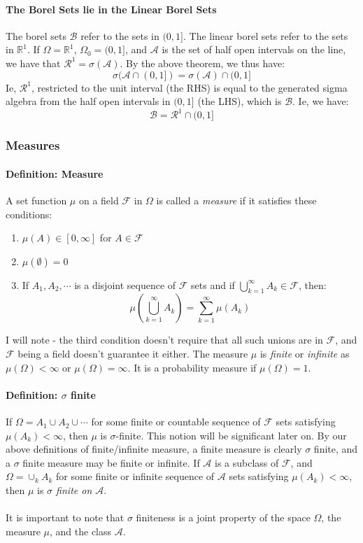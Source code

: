 \documentclass[12pt,a4paper]{article}
\newcommand{\1}[1]{\mathbbm{1}\left\{ #1 \right\}}
\newcommand{\R}{\mathbb{R}}
\newcommand{\acal}{\mathcal{A}}
\newcommand{\fcal}{\mathcal{F}}
\newcommand{\bcal}{\mathcal{B}}
\newcommand{\rcal}{\mathcal{R}}
\begin{document}
\paragraph{The Borel Sets lie in the Linear Borel Sets} The borel sets $\bcal$ refer to the sets in $(0,1]$. The linear borel sets refer to the sets in $\R^1$. If $\Omega = \R^1$, $\Omega_0 = (0,1]$, and $\acal$ is the set of half open intervals on the line, we have that $\rcal^1 = \sigma(\acal)$. By the above theorem, we thus have:
$$
	\sigma(\acal \cap (0,1]) = \sigma(\acal) \cap (0,1]
$$
Ie, $\rcal^1$, restricted to the unit interval (the RHS) is equal to the generated sigma algebra from the half open intervals in $(0,1]$ (the LHS), which is $\bcal$. Ie, we have:
$$
	\bcal = \rcal^1 \cap (0,1]
$$

\subsubsection{Measures}
\paragraph{Definition: Measure} A set function $\mu$ on a field $\fcal$ in $\Omega$ is called a \textit{measure} if it satisfies these conditions:
\begin{enumerate}
	\item $\mu(A) \in [0,\infty]$ for $A \in \fcal$
	\item $\mu(\emptyset) = 0$
	\item If $A_1, A_2, \cdots$ is a disjoint sequence of $\fcal$ sets and if $\bigcup_{k=1}^\infty A_k \in \fcal$, then:
	$$
		\mu\left(\bigcup_{k=1}^\infty A_k\right) = \sum_{k=1}^\infty \mu(A_k)
	$$
\end{enumerate}
I will note - the third condition doesn't require that all such unions are in $\fcal$, and $\fcal$ being a field doesn't guarantee it either. The measure $\mu$ is \textit{finite} or \textit{infinite} as $\mu(\Omega) < \infty$ or $\mu(\Omega) = \infty$. It is a probability measure if $\mu(\Omega) = 1$.

\paragraph{Definition: $\sigma$ finite} If $\Omega = A_1 \cup A_2 \cup \cdots$ for some finite or countable sequence of $\fcal$ sets satisfying $\mu(A_k) < \infty$, then $\mu$ is $\sigma$-finite. This notion will be significant later on. By our above definitions of finite/infinite measure, a finite measure is clearly $\sigma$ finite, and a $\sigma$ finite measure may be finite or infinite. If $\acal$ is a subclass of $\fcal$, and $\Omega = \cup_k A_k$ for some finite or infinite sequence of $\acal$ sets satisfying $\mu(A_k) < \infty$, then $\mu$ is \textit{$\sigma$ finite on $\acal$}.
\\\\
It is important to note that $\sigma$ finiteness is a joint property of the space $\Omega$, the measure $\mu$, and the class $\acal$.
\end{document}

